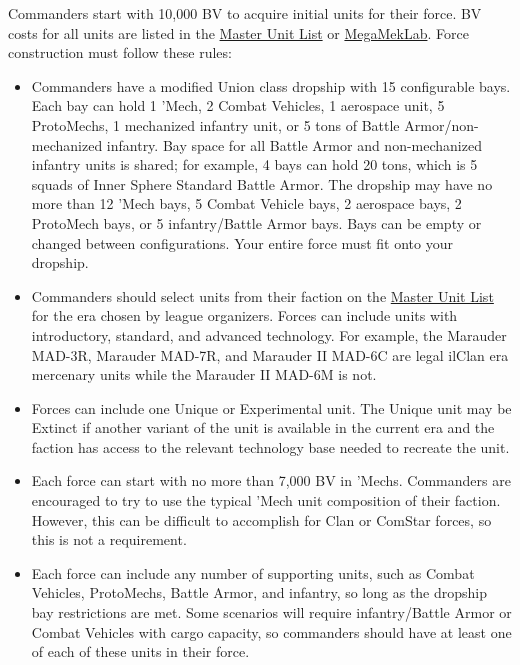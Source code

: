 Commanders start with 10,000 BV to acquire initial units for their force.
BV costs for all units are listed in the \href{http://www.masterunitlist.info}{Master Unit List} or \href{https://megamek.org}{MegaMekLab}.
Force construction must follow these rules:

\begin{itemize}

\item Commanders have a modified Union class dropship with 15 configurable bays.
Each bay can hold 1 'Mech, 2 Combat Vehicles, 1 aerospace unit, 5 ProtoMechs, 1 mechanized infantry unit, or 5 tons of Battle Armor/non-mechanized infantry.
Bay space for all Battle Armor and non-mechanized infantry units is shared; for example, 4 bays can hold 20 tons, which is 5 squads of Inner Sphere Standard Battle Armor.
The dropship may have no more than 12 'Mech bays, 5 Combat Vehicle bays, 2 aerospace bays, 2 ProtoMech bays, or 5 infantry/Battle Armor bays.
Bays can be empty or changed between configurations.
Your entire force must fit onto your dropship.

\item Commanders should select units from their faction on the \href{http://www.masterunitlist.info/}{Master Unit List} for the era chosen by league organizers.
Forces can include units with introductory, standard, and advanced technology.
For example, the Marauder MAD-3R, Marauder MAD-7R, and Marauder II MAD-6C are legal ilClan era mercenary units while the Marauder II MAD-6M is not.

\item Forces can include one Unique or Experimental unit.
The Unique unit may be Extinct if another variant of the unit is available in the current era and the faction has access to the relevant technology base needed to recreate the unit.

\item Each force can start with no more than 7,000 BV in 'Mechs.
Commanders are encouraged to try to use the typical 'Mech unit composition of their faction.
However, this can be difficult to accomplish for Clan or ComStar forces, so this is not a requirement.

\item Each force can include any number of supporting units, such as Combat Vehicles, ProtoMechs, Battle Armor, and infantry, so long as the dropship bay restrictions are met.
Some scenarios will require infantry/Battle Armor or Combat Vehicles with cargo capacity, so commanders should have at least one of each of these units in their force.


\end{itemize}
